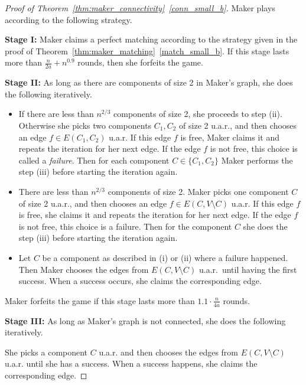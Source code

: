 \documentclass[11pt, a4paper]{article}
\numberwithin{equation}{section}
\numberwithin{figure}{section}
\begin{document}
\begin{proof}[Proof of Theorem~\ref{thm:maker_connectivity}~\ref{conn_small_b}]
Maker plays according to the following strategy. 

\smallskip

\textbf{Stage I:} Maker claims a perfect matching
according to the strategy given in the proof of
Theorem~\ref{thm:maker_matching}~\ref{match_small_b}.
If this stage lasts more than $\frac{n}{2a}+n^{0.9}$ rounds, then she forfeits the game.

\smallskip

\textbf{Stage II:} As long as there are components of size 2 in Maker's graph, she does the following iteratively.
\begin{itemize}
\item[(i)] 
If there are less than $n^{2/3}$ components of size 2,
she proceeds to step (ii). Otherwise she picks two components $C_1,C_2$ of size 2 u.a.r., and then chooses an edge $f\in E(C_1,C_2)$
u.a.r. 
If this edge $f$ is free, Maker claims it
and repeats the iteration for her next edge. 
If the edge $f$ is not free, this choice is called a \emph{failure}.
Then for each component $C\in \{C_1,C_2\}$ Maker performs the step (iii) before starting the iteration again.
\item[(ii)] 
There are less than $n^{2/3}$ components of size 2. 
Maker picks one component $C$ of size 2 u.a.r., and then chooses an edge $f\in E(C,V\setminus C)$ u.a.r. 
If this edge $f$ is free, she claims it
and repeats the iteration for her next edge. 
If the edge $f$ is not free, this choice is a failure.
Then for the component $C$ she does the step (iii)
before starting the iteration again.
\item[(iii)] Let $C$ be a component as described in (i) or (ii) where a failure happened. Then Maker chooses the edges from $E(C,V\setminus C)$ u.a.r.~until having the first success. When a success occurs, she claims the corresponding edge. 
\end{itemize}

Maker forfeits the game if this stage lasts more than $1.1\cdot \frac{n}{4a}$ rounds.

\smallskip

\textbf{Stage III:} As long as Maker's graph is not connected, she does the following iteratively.

She picks a component $C$ u.a.r. and then chooses the edges from $E(C,V\setminus C)$ 
u.a.r. until she has a success. When a success happens,  she claims the corresponding edge. 


\end{proof}
\end{document}

